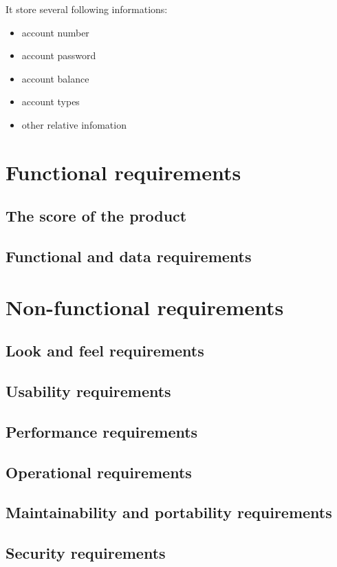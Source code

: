 \documentclass{scrreprt}
\begin{document}
It store several following informations:
\begin{itemize}
    \item account number
    \item account password
    \item account balance 
    \item account types
    \item other relative infomation
\end{itemize}

\chapter{Functional requirements}

\section{The score of the product}

\section{Functional and data requirements}

\chapter{Non-functional requirements}
\section{Look and feel requirements}

\section{Usability requirements}

\section{Performance requirements}

\section{Operational requirements}
\section{Maintainability and portability requirements}
\section{Security requirements}
\end{document}
